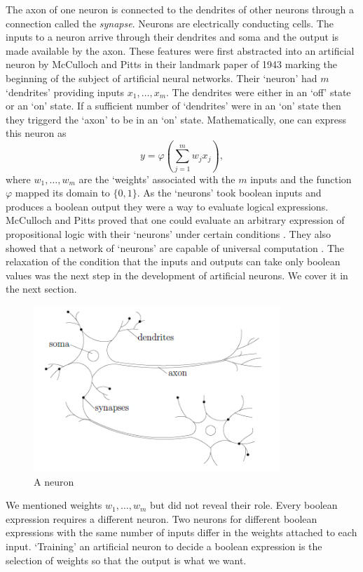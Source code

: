 \documentclass[11pt]{article}
\numberwithin{equation}{section}
\begin{document}
The axon of one neuron is connected to the dendrites of other neurons through
a connection called the \emph{synapse}. Neurons are electrically conducting
cells. The inputs to a neuron arrive through their dendrites and soma and the 
output is made available by the axon. These features were first abstracted
into an artificial neuron by McCulloch and Pitts in their landmark paper 
\cite{mcculloch1943logical} of 1943 marking the beginning of the subject of
artificial neural networks. Their `neuron' had $m$ `dendrites' providing 
inputs $x_1, \ldots, x_m$. The dendrites were either in an `off' state or an
`on' state. If a sufficient number of `dendrites' were in an `on' state then 
they triggerd the `axon' to be in an `on' state. Mathematically, one can 
express this neuron as
\begin{equation}\label{s1e1}
y = \varphi\left(\sum_{j=1}^m w_j x_j\right),
\end{equation}
where $w_1, \ldots, w_m$ are the `weights' associated with the $m$ inputs and
the function $\varphi$ mapped its domain to $\{0, 1\}$. As the `neurons' took
boolean inputs and produces a boolean output they were a way to evaluate
logical expressions. McCulloch and Pitts proved that one could evaluate an
arbitrary expression of propositional logic with their `neurons' under certain
conditions \cite{mcculloch1943logical}. They also showed that a network of
`neurons' are capable of universal computation \cite{bishop1994neural}. The
relaxation of the condition that the inputs and outputs can take only boolean
values was the next step in the development of artificial neurons. We cover it
in the next section.
\begin{figure}[!ht]
\centering
\includegraphics[scale=0.5]{neuron}
\caption{A neuron}
\label{f1}
\end{figure}

We mentioned weights $w_1, \ldots, w_m$ but did not reveal their role. Every
boolean expression requires a different neuron. Two neurons for different
boolean expressions with the same number of inputs differ in the weights 
attached to each input. `Training' an artificial neuron to decide a boolean
expression is the selection of weights so that the output is what we want.
\end{document}
